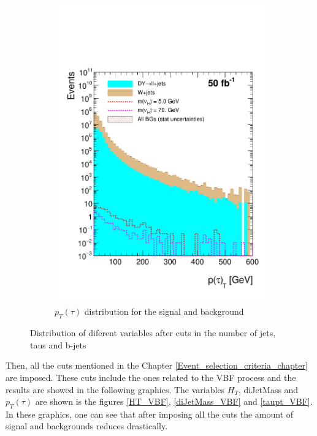 \begin{figure}[h]
\begin{subfigure}{.5\textwidth}
  \includegraphics[width=1.1\linewidth]{./Capitulos/Analysis/AfterBJets/TauPt_MET_20}
  \caption{$p_T(\tau)$ distribution for the signal and background}
  \label{taupt_bjets}
\end{subfigure}
\caption{Distribution of diferent variables after cuts in the number of jets, taus and b-jets}
\label{Variables_bjets}
\end{figure}
 
 Then, all the cuts mentioned in the Chapter \ref{Event_selection_criteria_chapter} are imposed. These cuts include the ones related to the VBF process and the results are showed in the following 
 graphics. The variables $H_T$, diJetMass and $p_T(\tau)$ are shown is the figures \ref{HT_VBF}, \ref{diJetMass_VBF} and \ref{taupt_VBF}. In these graphics, one can see that after imposing all the 
 cuts the amount of signal and backgrounds reduces drastically. 
 
